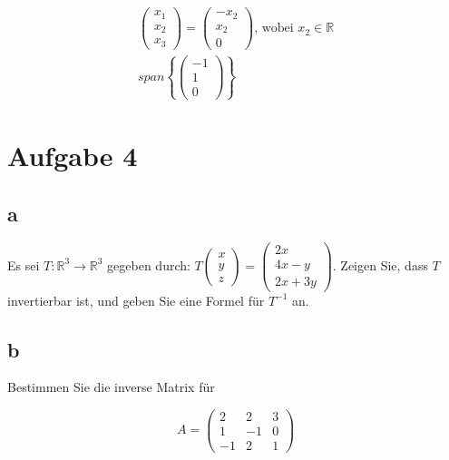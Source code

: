 \begin{align*}
\begin{pmatrix}
    x_1 \\ x_2 \\ x_3
\end{pmatrix} = \begin{pmatrix}
    -x_2 \\ x_2 \\ 0
\end{pmatrix} \text{, wobei } x_2 \in \mathbb{R} \\
span\left\{\begin{pmatrix}
    -1 \\ 1 \\ 0
\end{pmatrix}\right\}
\end{align*}

\section{Aufgabe 4}

\subsection{a}
Es sei $T: \mathbb{R}^3 \rightarrow \mathbb{R}^3$ gegeben durch: $T \begin{pmatrix} x \\ y \\ z \end{pmatrix} = \begin{pmatrix}2x \\ 4x-y \\ 2x+3y\end{pmatrix}$. Zeigen Sie, dass $T$ invertierbar ist, und geben Sie eine Formel für $T^{-1}$ an.

\subsection{b}
Bestimmen Sie die inverse Matrix für

\[
A = \begin{pmatrix}
    2 & 2 & 3 \\ 1 & -1 & 0 \\ -1 & 2 & 1
\end{pmatrix}
\]